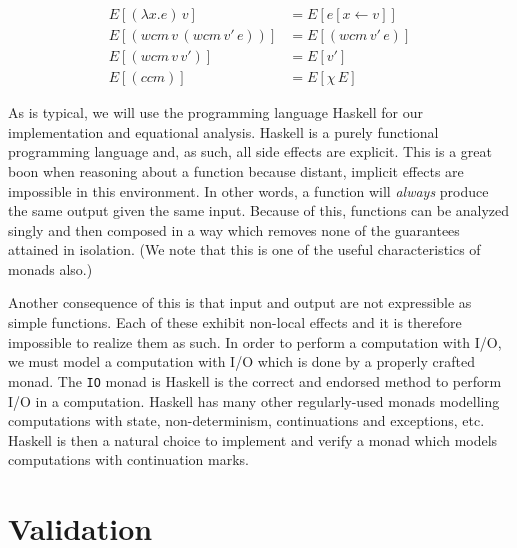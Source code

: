 \documentclass[ms]{byuprop}
\begin{document}
\begin{align*}
E[(\lambda x.e)\,v]       &= E[e[x\leftarrow v]]\\
E[(wcm\,v\,(wcm\,v'\,e))] &= E[(wcm\,v'\,e)]\\
E[(wcm\,v\,v')]           &= E[v']\\
E[(ccm)]                  &= E[\chi\,E]
\end{align*}





As is typical, we will use the programming language Haskell \cite{jones2003haskell} for
our implementation and equational analysis. Haskell is a purely functional programming
language and, as such, all side effects are explicit. This is a great boon when reasoning
about a function because distant, implicit effects are impossible in this environment. In
other words, a function will \emph{always} produce the same output given the same input.
Because of this, functions can be analyzed singly and then composed in a way which removes
none of the guarantees attained in isolation. (We note that this is one of the useful
characteristics of monads also.)


Another consequence of this is that input and output are not expressible as simple
functions. Each of these exhibit non-local effects and it is therefore impossible to
realize them as such. In order to perform a computation with I/O, we must model a
computation with I/O which is done by a properly crafted monad. The \texttt{IO} monad is
Haskell is the correct and endorsed method to perform I/O in a computation. Haskell has
many other regularly-used monads modelling computations with state, non-determinism,
continuations and exceptions, etc. Haskell is then a natural choice to implement and
verify a monad which models computations with continuation marks.

\section{Validation}
\end{document}
